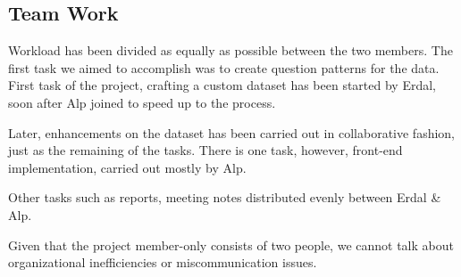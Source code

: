 \documentclass{mefsdp}
\begin{document}
	\subsection{Team Work}
	Workload has been divided as equally as possible between the two members. The first task we aimed to accomplish was to create question patterns for the data. First task of the project, crafting a custom dataset has been started by Erdal, soon after Alp joined to speed up to the process. \newline \par 
	
	Later, enhancements on the dataset has been carried out in collaborative fashion, just as the remaining of the tasks. There is one task, however, front-end implementation, carried out mostly by Alp.  
	
	Other tasks such as reports, meeting notes distributed evenly between Erdal \& Alp.\newline \par
	
	Given that the project member-only consists of two people, we cannot talk about organizational inefficiencies or miscommunication issues. 
	
	\begin{appendix}
	\end{appendix}
\end{document}
